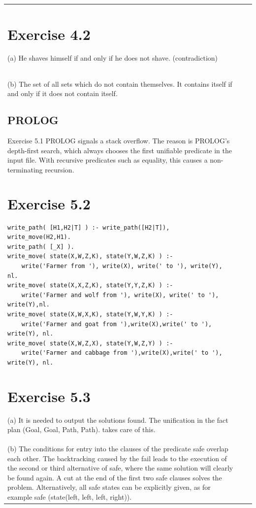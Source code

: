 \documentclass[10pt]{book}
\begin{document}
\begin{center}
\begin{tabular}{|l|l|l|}
\section{Exercise 4.2}
(a) He shaves himself if and only if he does not shave. (contradiction)\\
(b) The set of all sets which do not contain themselves. It contains itself if and only if it does not contain itself.

\subsection{PROLOG}
Exercise 5.1 PROLOG signals a stack overflow. The reason is PROLOG's depth-first search, which always chooses the first unifiable predicate in the input file. With recursive predicates such as equality, this causes a non-terminating recursion.

\section{Exercise 5.2}
\begin{verbatim}
write_path( [H1,H2|T] ) :- write_path([H2|T]), write_move(H2,H1).
write_path( [_X] ).
write_move( state(X,W,Z,K), state(Y,W,Z,K) ) :-
    write('Farmer from '), write(X), write(' to '), write(Y), nl.
write_move( state(X,X,Z,K), state(Y,Y,Z,K) ) :-
    write('Farmer and wolf from '), write(X), write(' to '), write(Y),nl.
write_move( state(X,W,X,K), state(Y,W,Y,K) ) :-
    write('Farmer and goat from '),write(X),write(' to '), write(Y), nl.
write_move( state(X,W,Z,X), state(Y,W,Z,Y) ) :-
    write('Farmer and cabbage from '),write(X),write(' to '), write(Y), nl.
\end{verbatim}

\section{Exercise 5.3}
(a) It is needed to output the solutions found. The unification in the fact plan (Goal, Goal, Path, Path). takes care of this.\\
(b) The conditions for entry into the clauses of the predicate safe overlap each other. The backtracking caused by the fail leads to the execution of the second or third alternative of safe, where the same solution will clearly be found again. A cut at the end of the first two safe clauses solves the problem. Alternatively, all safe states can be explicitly given, as for example safe (state(left, left, left, right)).


\end{tabular}
\end{center}
\end{document}
